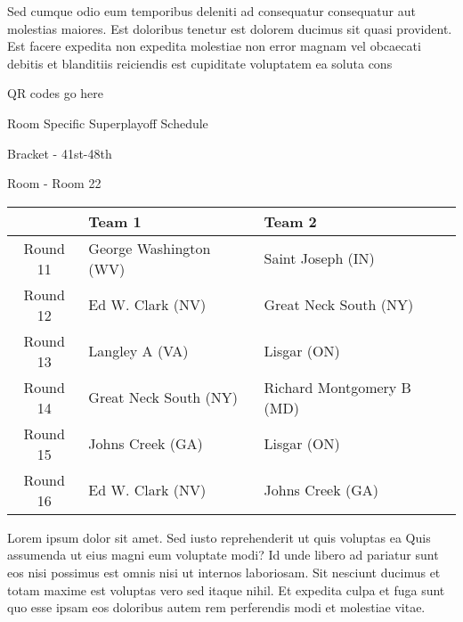 \documentclass{article}%
\begin{document}
\newline%
    Sed cumque odio eum temporibus deleniti ad consequatur consequatur aut molestias maiores. Est doloribus tenetur est dolorem ducimus sit quasi provident. Est facere expedita non expedita molestiae non error magnam vel obcaecati debitis et blanditiis reiciendis est cupiditate voluptatem ea soluta cons%
\vspace*{140pt}%
\begin{center}%
\begin{Huge}%
QR codes go here%
\end{Huge}%
\end{center}%
\newpage%
\begin{center}%
\begin{Huge}%
Room Specific Superplayoff Schedule%
\end{Huge}%
\vspace*{8pt}%
\linebreak%
\begin{Large}%
Bracket {-} 41st{-}48th%
\end{Large}%
\vspace*{8pt}%
\linebreak%
\vspace*{8pt}%
\begin{Large}%
Room {-} Room 22%
\end{Large}%
\end{center}%
%
\begin{tabularx}{\textwidth}{|c|Y|Y|}%
\hline%
&Team 1&Team 2\\%
\hline%
Round 11&George Washington (WV)&Saint Joseph (IN)\\%
Round 12&Ed W. Clark (NV)&Great Neck South (NY)\\%
Round 13&Langley A (VA)&Lisgar (ON)\\%
Round 14&Great Neck South (NY)&Richard Montgomery B (MD)\\%
Round 15&Johns Creek (GA)&Lisgar (ON)\\%
Round 16&Ed W. Clark (NV)&Johns Creek (GA)\\%
\hline%
\end{tabularx}%
\vspace*{8pt}%
\newline%
    Lorem ipsum dolor sit amet. Sed iusto reprehenderit ut quis voluptas ea Quis assumenda ut eius magni eum voluptate modi? Id unde libero ad pariatur sunt eos nisi possimus est omnis nisi ut internos laboriosam. Sit nesciunt ducimus et totam maxime est voluptas vero sed itaque nihil. Et expedita culpa et fuga sunt quo esse ipsam eos doloribus autem rem perferendis modi et molestiae vitae.\newline%
\end{document}

